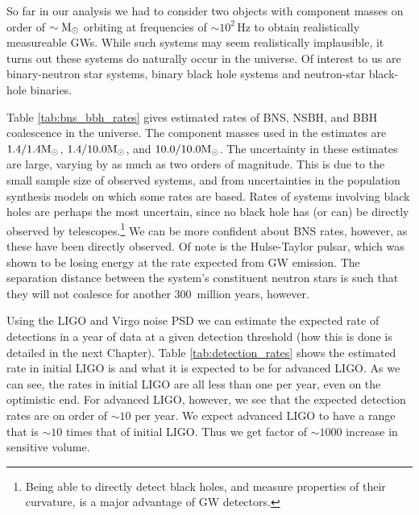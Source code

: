 So far in our analysis we had to consider two objects with component masses on order of $\sim \mathrm{M_\odot}$ orbiting at frequencies of $\sim 10^2\,$Hz to obtain realistically measureable \acp{GW}. While such systems may seem realistically implausible, it turns out these systems do naturally occur in the universe. Of interest to us are binary-neutron star systems, binary black hole systems and neutron-star black-hole binaries.

Table \ref{tab:bns_bbh_rates} gives estimated rates of \ac{BNS}, \ac{NSBH}, and \ac{BBH} coalescence in the universe. The component masses used in the estimates are $1.4/1.4\mathrm{M_\odot}$, $1.4/10.0\mathrm{M_\odot}$, and $10.0/10.0\mathrm{M_\odot}$. The uncertainty in these estimates are large, varying by as much as two orders of magnitude. This is due to the small sample size of observed systems, and from uncertainties in the population synthesis models on which some rates are based. Rates of systems involving black holes are perhaps the most uncertain, since no black hole has (or can) be directly observed by telescopes.\footnote{Being able to directly detect black holes, and measure properties of their curvature, is a major advantage of \ac{GW} detectors.} We can be more confident about \ac{BNS} rates, however, as these have been directly observed. Of note is the Hulse-Taylor pulsar, which was shown to be losing energy at the rate expected from \ac{GW} emission. The separation distance between the system's constituent neutron stars is such that they will not coalesce for another $300\,$ million years, however.

Using the \ac{LIGO} and Virgo noise \ac{PSD} we can estimate the expected rate of detections in a year of data at a given detection threshold (how this is done is detailed in the next Chapter). Table \ref{tab:detection_rates} shows the estimated rate in initial \ac{LIGO} is and what it is expected to be for advanced \ac{LIGO}. As we can see, the rates in initial \ac{LIGO} are all less than one per year, even on the optimistic end. For advanced \ac{LIGO}, however, we see that the expected detection rates are on order of $\sim 10$ per year. We expect advanced \ac{LIGO} to have a range that is $\sim10$ times that of initial \ac{LIGO}. Thus we get factor of $\sim1000$ increase in sensitive volume.

